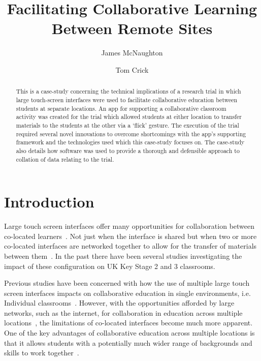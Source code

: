 \documentclass[a4paper,11pt]{article}
\title{Facilitating Collaborative Learning Between Remote Sites}
\author[1]{James McNaughton}
\author[2]{Tom Crick}
\affil[1]{School of Education, Durham University, UK}
\affil[2]{Department of Computing \& Information Systems, Cardiff
  Metropolitan University, UK}
\affil[1]{\protect\url{j.a.mcnaughton@durham.ac.uk}}
\affil[2]{\protect\url{tcrick@cardiffmet.ac.uk}}
\date{ }
\begin{document}
\maketitle


\begin{abstract}
This is a case-study concerning the technical implications of a research trial in which large touch-screen interfaces were used to facilitate collaborative education between students at separate locations.
An app for supporting a collaborative classroom activity was created for the trial which allowed students at either location to transfer materials to the students at the other via a `flick' gesture.
The execution of the trial required several novel innovations to overcome shortcomings with the app's supporting framework and the technologies used which this case-study focuses on.
The case-study also details how software was used to provide a thorough and defensible approach to collation of data relating to the trial.
\end{abstract}

\section{Introduction}

Large touch screen interfaces offer many opportunities for collaboration between co-located learners~\cite{harris:2009,kharrufa:2013}.
Not just when the interface is shared but when two or more co-located interfaces are networked together to allow for the transfer of materials between them~\cite{kreitmayer:2013,mercier:2013}.
In the past there have been several studies investigating the impact of these configuration on UK Key Stage 2 and 3 classrooms. 


Previous studies have been concerned with how the use of multiple large touch screen interfaces impacts on collaborative education in single environments, i.e. Individual classrooms~\cite{mohammed:2012,kreitmayer:2013,mercier:2015}.
However, with the opportunities afforded by large networks, such as the internet, for collaboration in education across multiple locations~\cite{daradoumis2000,mcconnell2012}, the limitations of co-located interfaces become much more apparent.
One of the key advantages of collaborative education across multiple locations is that it allows students with a potentially much wider range of backgrounds and skills to work together~\cite{kizilcec:2013}.
\end{document}
